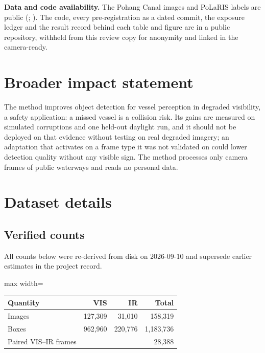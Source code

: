 \documentclass[10pt]{article}
\begin{document}
\textbf{Data and code availability.} The Pohang Canal images and PoLaRIS labels are public (\citealp{chung2023pohang}; \citealp{choi2025polaris}). The code, every pre-registration as a dated commit, the exposure ledger and the result record behind each table and figure are in a public repository, withheld from this review copy for anonymity and linked in the camera-ready.

\section{Broader impact statement}\label{sec:9}
The method improves object detection for vessel perception in degraded visibility, a safety application: a missed vessel is a collision risk. Its gains are measured on simulated corruptions and one held-out daylight run, and it should not be deployed on that evidence without testing on real degraded imagery; an adaptation that activates on a frame type it was not validated on could lower detection quality without any visible sign. The method processes only camera frames of public waterways and reads no personal data.

\FloatBarrier



\appendix
\FloatBarrier
\section{Dataset details}\label{app:A}
\subsection{Verified counts}\label{app:A.1}
All counts below were re-derived from disk on 2026-09-10 and supersede earlier estimates in the project record.

\begin{center}
\small
\begin{adjustbox}{max width=\linewidth}
\begin{tabular}{lrrr}
\toprule
Quantity & VIS & IR & Total \\
\midrule
Images & 127,309 & 31,010 & 158,319 \\
Boxes & 962,960 & 220,776 & 1,183,736 \\
Paired VIS--IR frames &  &  & 28,388 \\
\bottomrule
\end{tabular}
\end{adjustbox}
\end{center}
\end{document}

